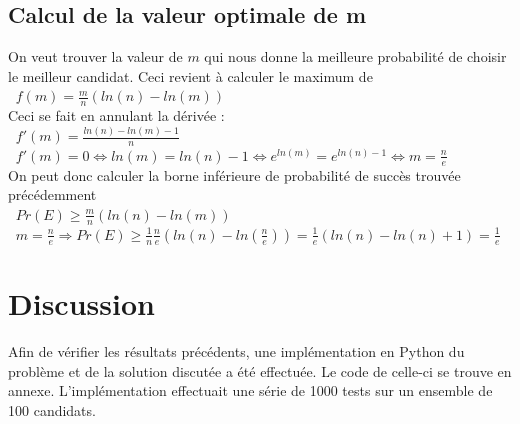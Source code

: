 \documentclass[a4paper,10pt]{article}
\begin{document}
\subsection{Calcul de la valeur optimale de m}

On veut trouver la valeur de 
\begin{math}m\end{math}
qui nous donne la meilleure probabilité de choisir le meilleur candidat. Ceci revient à calculer le maximum de\\

\begin{math}\;\;f(m) = \frac{m}{n} (ln(n) - ln(m))\end{math}\\

Ceci se fait en annulant la dérivée :\\

\begin{math}\;\;f'(m) = \frac{ln(n) - ln(m) - 1}{n}\end{math}\\

\begin{math}\;\;f'(m) = 0 \Leftrightarrow ln(m) = ln(n) - 1\Leftrightarrow e^{ln(m)} = e^{ln(n) - 1}\Leftrightarrow m = \frac{n}{e}\end{math}\\

On peut donc calculer la borne inférieure de probabilité de succès trouvée précédemment\\

\begin{math}\;\; Pr(E) \geq \frac{m}{n} (ln(n) - ln(m))\end{math}\\

\begin{math}\;\; m = \frac{n}{e} \Rightarrow Pr(E) \geq \frac{1}{n} \frac{n}{e}(ln(n) - ln(\frac{n}{e}))
= \frac{1}{e} (ln(n) - ln(n) + 1) = \frac{1}{e}\end{math}\\

\section{Discussion}
Afin de vérifier les résultats précédents, une implémentation en Python du problème et de la solution discutée a été effectuée.
Le code de celle-ci se trouve en annexe. L'implémentation effectuait une série de 1000 tests sur un ensemble de 100 candidats.
\end{document}

